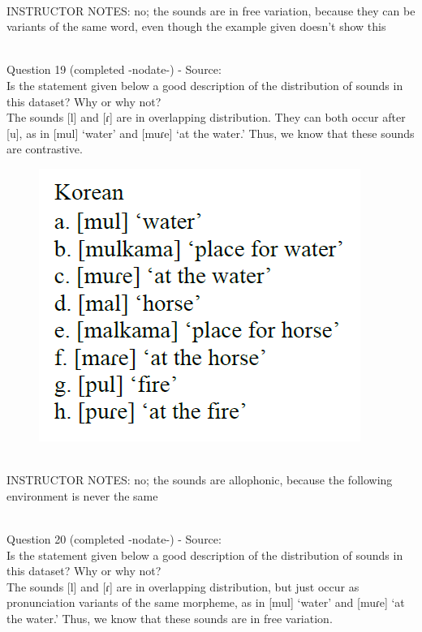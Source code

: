 \documentclass[12pt]{article}
\begin{document}
~\\
INSTRUCTOR NOTES: no; the sounds are in free variation, because they can be variants of the same word, even though the example given doesn't show this


~\\

{\large Question 19} (completed -nodate-) - Source: \\

Is the statement given below a good description of the distribution of sounds in this dataset? Why or why not?\\

The sounds {[l]} and {[ɾ]} are in overlapping distribution. They can both occur after {[u]}, as in {[mul]} ‘water’ and {[muɾe]} ‘at the water.’ Thus, we know that these sounds are contrastive.

\begin{figure}[H]
\includegraphics{../images/korean.png}
\end{figure}

~\\
INSTRUCTOR NOTES: no; the sounds are allophonic, because the following environment is never the same


~\\

{\large Question 20} (completed -nodate-) - Source: \\

Is the statement given below a good description of the distribution of sounds in this dataset? Why or why not?\\

The sounds {[l]} and {[ɾ]} are in overlapping distribution, but just occur as pronunciation variants of the same morpheme, as in {[mul]} ‘water’ and {[muɾe]} ‘at the water.’ Thus, we know that these sounds are in free variation.
\end{document}
